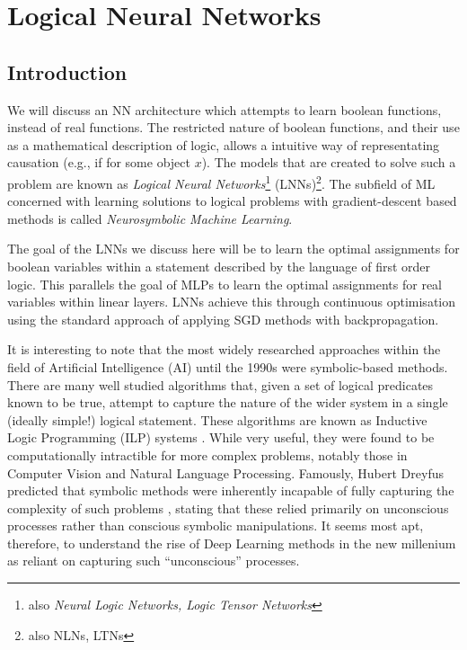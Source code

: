 
\chapter{Logical Neural Networks}

\section{Introduction}

We will discuss an NN architecture which attempts to learn boolean functions, instead of real functions. The restricted nature of boolean functions, and their use as a mathematical description of logic, allows a intuitive way of representating causation (e.g., if for some object $x$). The models that are created to solve such a problem are known as \textit{Logical Neural Networks}\footnote{also \textit{Neural Logic Networks, Logic Tensor Networks}} (LNNs)\footnote{also NLNs, LTNs}. The subfield of ML concerned with learning solutions to logical problems with gradient-descent based methods is called \textit{Neurosymbolic Machine Learning}.

The goal of the LNNs we discuss here will be to learn the optimal assignments for boolean variables within a statement described by the language of first order logic. This parallels the goal of MLPs to learn the optimal assignments for real variables within linear layers. LNNs achieve this through continuous optimisation using the standard approach of applying SGD methods with backpropagation. 

It is interesting to note that the most widely researched approaches within the field of Artificial Intelligence (AI) until the 1990s were symbolic-based methods. There are many well studied algorithms that, given a set of logical predicates known to be true, attempt to capture the nature of the wider system in a single (ideally simple!) logical statement. These algorithms are known as Inductive Logic Programming (ILP) systems \cite{ilp}. While very useful, they were found to be computationally intractible for more complex problems, notably those in Computer Vision and Natural Language Processing. Famously, Hubert Dreyfus predicted that symbolic methods were inherently incapable of fully capturing the complexity of such problems \cite{symbolicaibad}, stating that these relied primarily on unconscious processes rather than conscious symbolic manipulations. It seems most apt, therefore, to understand the rise of Deep Learning methods in the new millenium as reliant on capturing such ``unconscious'' processes.

